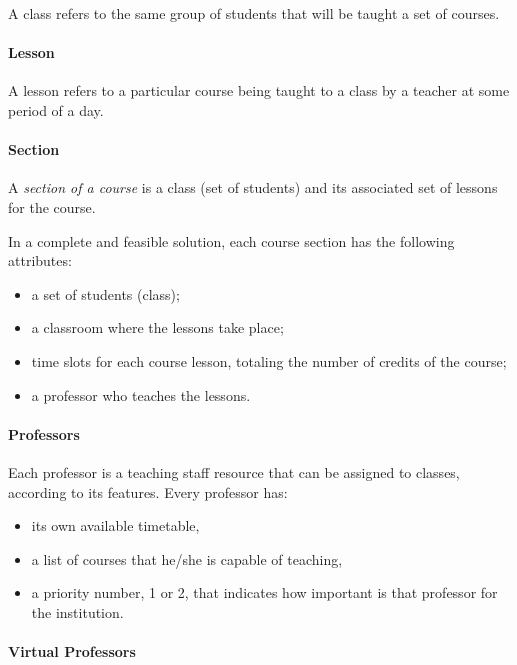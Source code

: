 A class refers to the same group of students that will be taught a set of courses.


\paragraph{Lesson}
\label{deflesson}

A lesson refers to a particular course being taught to a class by a teacher at some period of a day.


\paragraph{Section}
\label{defsection}

A \textit{section of a course} is a class (set of students) and its associated set of lessons for the course.

In a complete and feasible solution, each course section has the following attributes:
\begin{itemize}
\item a set of students (class);
\item a classroom where the lessons take place;
\item time slots for each course lesson, totaling the number of credits of the course;
\item a professor who teaches the lessons.
\end{itemize}


\paragraph{Professors}
\label{defprof}

Each professor is a teaching staff resource that can be assigned to classes, according to its features. Every professor has:
\begin{itemize}
\item its own available timetable,
\item a list of courses that he/she is capable of teaching,
\item a priority number, 1 or 2, that indicates how important is that professor for the institution.
\end{itemize}




\paragraph{Virtual Professors}
\label{defpv}


